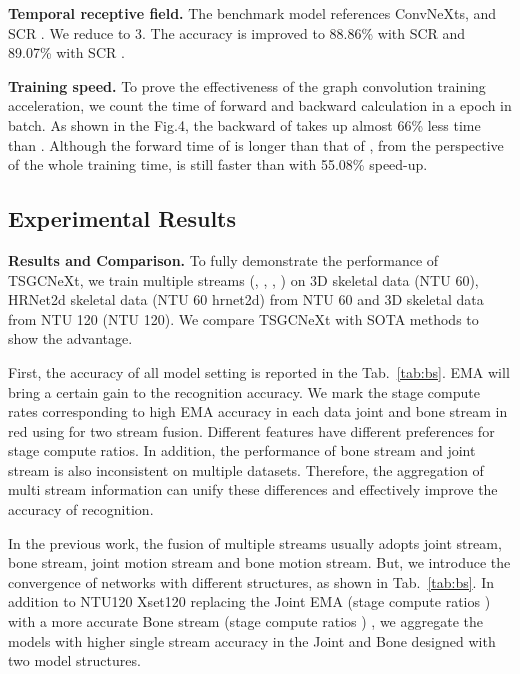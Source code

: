 \documentclass[10pt,twocolumn,letterpaper]{article}
\begin{document}
\noindent\textbf{Temporal receptive field.} The benchmark model references ConvNeXts,  and SCR . We reduce  to 3. The accuracy is improved to 88.86\% with SCR  and 89.07\% with SCR .

\noindent\textbf{Training speed.} To prove the effectiveness of the graph convolution training acceleration, we count the time of forward and backward calculation in a epoch in batch. As shown in the Fig.4, the backward of  takes up almost 66\% 
less time than . Although the forward time of  is longer than that of , from the perspective of the whole training time,  is still faster than  with 55.08\% speed-up.

\subsection{Experimental Results}
\label{er}
\noindent\textbf{Results and Comparison.} To fully demonstrate the performance of TSGCNeXt, we train multiple streams (, , , ) on 3D skeletal data (NTU 60), HRNet2d skeletal data (NTU 60 hrnet2d) from NTU 60 and 3D skeletal data from NTU 120 (NTU 120). We compare TSGCNeXt with SOTA methods to show the advantage. 

First, the accuracy of all model setting is reported in the Tab.~\ref{tab:bs}.  EMA will bring a certain gain to the recognition accuracy. We mark the stage compute rates corresponding to high EMA accuracy in each data joint and bone stream in red using for two stream fusion. Different features have different preferences for stage compute ratios. In addition, the performance of bone stream and joint stream is also inconsistent on multiple datasets. Therefore, the aggregation of multi stream information can unify these differences and effectively improve the accuracy of recognition.

In the previous work, the fusion of multiple streams usually adopts joint stream, bone stream, joint motion stream and bone motion stream. But, we introduce the convergence of networks with different structures, as shown in Tab.~\ref{tab:bs}. In addition to NTU120 Xset120 replacing the Joint EMA (stage compute ratios ) with a more accurate Bone stream (stage compute ratios ) , we aggregate the models with higher single stream accuracy in the Joint and Bone designed with two model structures.
\end{document}
